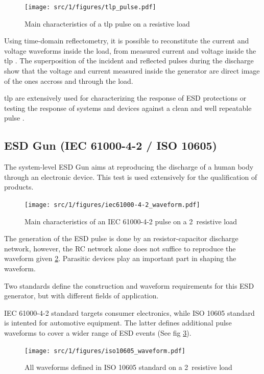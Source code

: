 \begin{figure}[!h]
  \centering
  \texttt{[image: src/1/figures/tlp\_pulse.pdf]}
  \caption{Main characteristics of a \gls{tlp} pulse on a resistive load}
  \label{tlp_pulse}
\end{figure}

Using time-domain reflectometry, it is possible to reconstitute the current and voltage waveforms inside the load,
from measured current and voltage inside the \gls{tlp} \cite{TLP}.
The superposition of the incident and reflected pulses during the discharge show that the voltage and current
measured inside the generator are direct image of the ones accross and through the load.

\gls{tlp} are extensively used for characterizing the response of ESD protections \cite{TLPforESDProtectionCz}
or testing the response of systems and devices against a clean and well repeatable pulse \cite{TLPthroubleshooting, LacrampeTransientImmunity}.

\subsection{ESD Gun (IEC 61000-4-2 / ISO 10605)}
The system-level ESD Gun aims at reproducing the discharge of a human body through an electronic device.
This test is used extensively for the qualification of products.

\begin{figure}[!h]
  \centering
  \texttt{[image: src/1/figures/iec61000-4-2\_waveform.pdf]}
  \caption{Main characteristics of an IEC 61000-4-2 pulse on a 2\textOmega\ resistive load}
  \label{iec_pulse}
\end{figure}

The generation of the ESD pulse is done by an resistor-capacitor discharge network, however, the RC network alone does not suffice to reproduce the waveform given \ref{iec_pulse}.
Parasitic devices play an important part in shaping the waveform.

Two standards define the construction and waveform requirements for this ESD generator, but with different fields of application.

IEC 61000-4-2\cite{iec61000-4-2} standard targets consumer electronics, while ISO 10605\cite{iso10605} standard is intented for automotive equipment.
The latter defines additional pulse waveforms to cover a wider range of ESD events (See fig \ref{iso_pulse}).

\begin{figure}[!h]
  \centering
  \texttt{[image: src/1/figures/iso10605\_waveform.pdf]}
  \caption{All waveforms defined in ISO 10605 standard on a 2\textOmega\ resistive load}
  \label{iso_pulse}
\end{figure}


